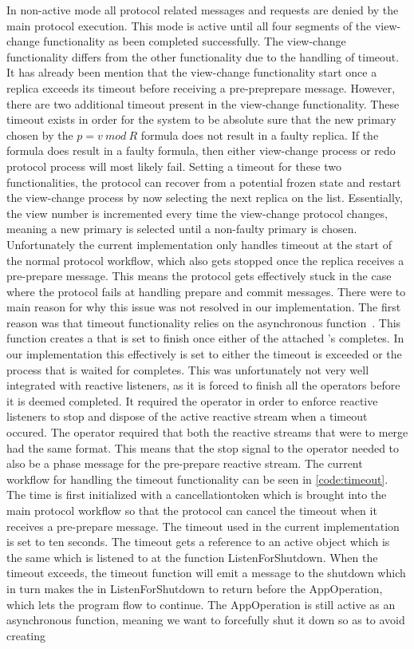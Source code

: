 In non-active mode all protocol related messages and requests are denied by the main protocol execution. This mode is active until all four segments of the view-change functionality as been completed successfully. The view-change functionality differs from the other functionality due to the handling of timeout. It has already been mention that the view-change functionality start once a replica exceeds its timeout before receiving a pre-preprepare message. However, there are two additional timeout present in the view-change functionality. These timeout exists in order for the system to be absolute sure that the new primary chosen by the $p = v ~mod~ R$ formula does not result in a faulty replica. If the formula does result in a faulty formula, then either view-change process or redo protocol process will most likely fail. Setting a timeout for these two functionalities, the protocol can recover from a potential frozen state and restart the view-change process by now selecting the next replica on the list. Essentially, the view number is incremented every time the view-change protocol changes, meaning a new primary is selected until a non-faulty primary is chosen. Unfortunately the current implementation only handles timeout at the start of the normal protocol workflow, which also gets stopped once the replica receives a pre-prepare message. This means the protocol gets effectively stuck in the case where the protocol fails at handling prepare and commit messages. There were to main reason for why this issue was not resolved in our implementation. The first reason was that timeout functionality relies on the  asynchronous function~\cite{WEB:whenany}. This function creates a  that is set to finish once either of the attached 's completes. In our implementation this effectively is set to either the timeout is exceeded or the process that is waited for completes. This was unfortunately not very well integrated with reactive listeners, as it is forced to finish all the operators before it is deemed completed. It required the  operator in order to enforce reactive listeners to stop and dispose of the active reactive stream when a timeout occured. The  operator required that both the reactive streams that were to merge had the same format. This means that the stop signal to the  operator needed to also be a phase message for the pre-prepare reactive stream. The current workflow for handling the timeout functionality can be seen in \autoref{code:timeout}. The time is first initialized with a cancellationtoken which is brought into the main protocol workflow so that the protocol can cancel the timeout when it receives a pre-prepare message. The timeout used in the current implementation is set to ten seconds. The timeout gets a reference to an active  object which is the same  which is listened to at the function ListenForShutdown. When the timeout exceeds, the timeout function will emit a message to the shutdown  which in turn makes the  in ListenForShutdown to return before the AppOperation, which lets the program flow to continue. The AppOperation is still active as an asynchronous function, meaning we want to forcefully shut it down so as to avoid creating 